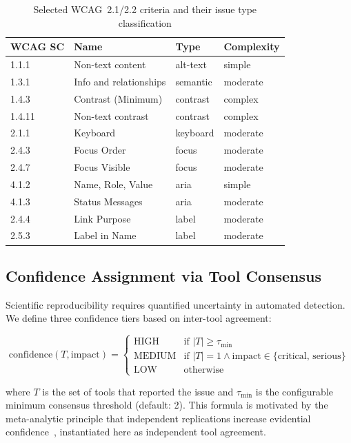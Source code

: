 \documentclass[10pt,conference]{IEEEtran}
\begin{document}
\begin{table}[htbp]
\caption{Selected WCAG~2.1/2.2 criteria and their issue type classification}
\label{tab:wcag_types}
\centering\small
\begin{tabularx}{\columnwidth}{lXll}
\toprule
\textbf{WCAG SC} & \textbf{Name} & \textbf{Type} & \textbf{Complexity} \\
\midrule
1.1.1 & Non-text content & alt-text   & simple   \\
1.3.1 & Info and relationships & semantic & moderate \\
1.4.3 & Contrast (Minimum) & contrast  & complex  \\
1.4.11 & Non-text contrast & contrast  & complex  \\
2.1.1 & Keyboard & keyboard  & moderate \\
2.4.3 & Focus Order & focus  & moderate \\
2.4.7 & Focus Visible & focus  & moderate \\
4.1.2 & Name, Role, Value & aria  & simple   \\
4.1.3 & Status Messages & aria  & moderate \\
2.4.4 & Link Purpose & label  & moderate \\
2.5.3 & Label in Name & label  & moderate \\
\bottomrule
\end{tabularx}
\end{table}

\subsection{Confidence Assignment via Tool Consensus}

Scientific reproducibility requires quantified uncertainty in automated
detection.  We define three confidence tiers based on inter-tool agreement:

\begin{equation}
  \text{confidence}(T, \text{impact}) =
  \begin{cases}
    \text{HIGH}   & \text{if } |T| \geq \tau_{\min} \\
    \text{MEDIUM} & \text{if } |T| = 1 \land \text{impact} \in \{\text{critical, serious}\} \\
    \text{LOW}    & \text{otherwise}
  \end{cases}
  \label{eq:confidence}
\end{equation}

where $T$ is the set of tools that reported the issue and $\tau_{\min}$ is the
configurable minimum consensus threshold (default: 2).  This formula is
motivated by the meta-analytic principle that independent replications increase
evidential confidence~\cite{cohen1988}, instantiated here as independent tool
agreement.
\end{document}
